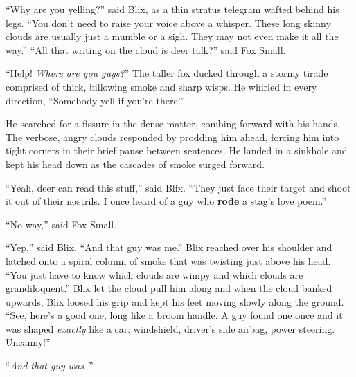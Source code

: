 \documentclass[12pt,twoside]{report}
\begin{document}
``Why are you yelling?'' said Blix, as a thin stratus telegram wafted
behind his legs.  ``You don't need to raise your voice above a
whisper.  These long skinny clouds are usually just a mumble or a
sigh.  They may not even make it all the way.''  ``All that writing on
the cloud is deer talk?'' said Fox Small.


``Help!  {\em Where are you guys?}''  The taller fox ducked through a
stormy tirade comprised of thick, billowing smoke and sharp wisps.  He
whirled in every direction, ``Somebody yell if you're there!''

He searched for a fissure in the dense matter, combing forward with
his hands.  The verbose, angry clouds responded by prodding him ahead,
forcing him into tight corners in their brief pause between sentences.
He landed in a sinkhole and kept his head down as the cascades of
smoke surged forward.

``Yeah, deer can read this stuff,'' said Blix.  ``They just face their
target and shoot it out of their nostrils.  I once heard of a guy who
{\bf rode} a stag's love poem.''

``No way,'' said Fox Small.

``Yep,'' said Blix.  ``And that guy was me.''  Blix reached over his
shoulder and latched onto a spiral column of smoke that was twisting
just above his head.  ``You just have to know which clouds are wimpy
and which clouds are grandiloquent.''  Blix let the cloud pull him
along and when the cloud banked upwards, Blix loosed his grip and kept
his feet moving slowly along the ground.  ``See, here's a good one,
long like a broom handle.  A guy found one once and it was shaped {\em
  exactly} like a car: windshield, driver's side airbag, power
steering. Uncanny!''

``{\em And that guy was--}''


\pagebreak
\end{document}
